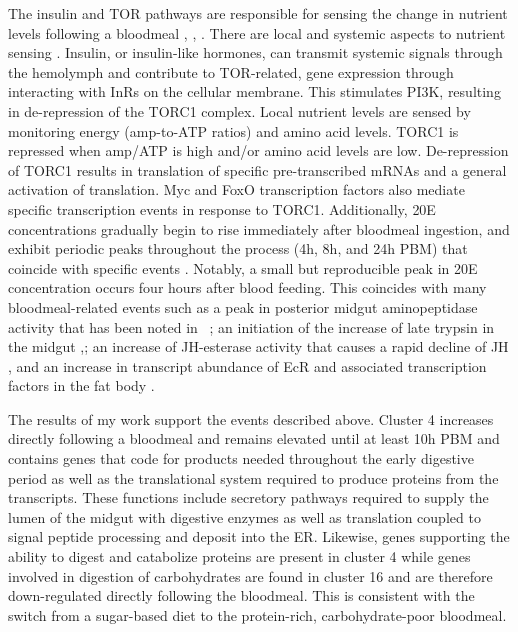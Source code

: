 The insulin and \gls{TOR} pathways are responsible for sensing the change in nutrient levels following a bloodmeal \cite{Roy2007}, \cite{Hietakangas2009}, \cite{Brandon2008}.
%
There are local and systemic aspects to nutrient sensing \cite{Hietakangas2009}.
%
Insulin, or insulin-like hormones, can transmit systemic signals through the hemolymph and contribute to \gls{TOR}-related, gene expression through interacting with \glspl{InR} on the cellular membrane.
%
This stimulates \gls{PI3K}, resulting in de-repression of the TORC1 complex.
%
Local nutrient levels are sensed by monitoring energy (\gls{amp}-to-\gls{ATP} ratios) and amino acid levels.
%
TORC1 is repressed when \gls{amp}/\gls{ATP} is high and/or amino acid levels are low.
%
De-repression of TORC1 results in translation of specific pre-transcribed mRNAs and a general activation of translation.
%
Myc and FoxO transcription factors also mediate specific transcription events in response to TORC1.
%
Additionally, \gls{20E} concentrations gradually begin to rise immediately after bloodmeal ingestion, and exhibit periodic peaks throughout the process (4h, 8h, and 24h \gls{PBM}) that coincide with specific events \cite{Hagedorn1975}.
%
Notably, a small but reproducible peak in \gls{20E} concentration occurs four hours after blood feeding.
%
This coincides with many bloodmeal-related events such as a peak in posterior midgut aminopeptidase activity that has been noted in \As\ \cite{Billingsley1991}; an initiation of the increase of late trypsin in the midgut \cite{Barillasmury1991},\cite{Graf1988}; an increase of \gls{JH}-esterase activity that causes a rapid decline of \gls{JH} \cite{Shapiro1986}, and an increase in transcript abundance of \gls{EcR} and associated transcription factors in the fat body \cite{Raikhel1999}.


The results of my work support the events described above.
%
Cluster 4 increases directly following a bloodmeal and remains elevated until at least 10h \gls{PBM} and contains genes that code for products needed throughout the early digestive period as well as the translational system required to produce proteins from the transcripts.
%
These functions include secretory pathways required to supply the lumen of the midgut with digestive enzymes as well as translation coupled to signal peptide processing and deposit into the \gls{ER}.
%
Likewise, genes supporting the ability to digest and catabolize proteins are present in cluster 4 while genes involved in digestion of carbohydrates are found in cluster 16 and are therefore down-regulated directly following the bloodmeal.
%
This is consistent with the switch from a sugar-based diet to the protein-rich, carbohydrate-poor bloodmeal. 


